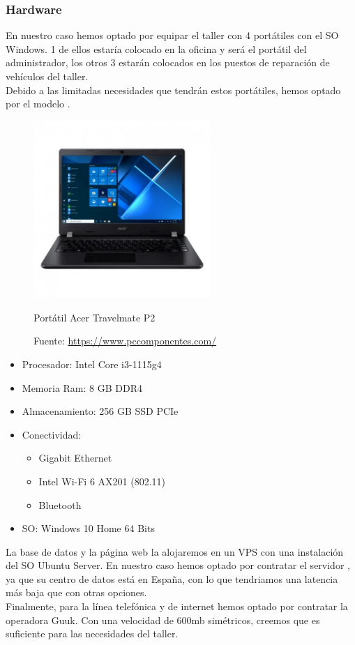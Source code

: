 \documentclass{article}
\begin{document}
\subsubsection{Hardware}
En nuestro caso hemos optado por equipar el taller con 4 portátiles con el SO Windows. 1 de ellos estaría colocado en la oficina y será el portátil del administrador, los otros 3 estarán colocados 
en los puestos de reparación de vehículos del taller.\\
Debido a las limitadas necesidades que tendrán estos portátiles, hemos optado por el modelo \href{https://www.pccomponentes.com/acer-travelmate-p2-tmp214-53-37at-intel-core-i3-1115g4-8gb-256gb-ssd-14}{}.\\
\begin{figure}[H]
  \centering
  \includegraphics[width=0.6\textwidth]{CapturasSistemas/portatil.png}
  \caption{Portátil Acer Travelmate P2}
  \caption*{Fuente: \href{https://www.pccomponentes.com/acer-travelmate-p2-tmp214-53-37at-intel-core-i3-1115g4-8gb-256gb-ssd-14}{https://www.pccomponentes.com/}}
\end{figure}
\begin{itemize}
  \item Procesador: Intel Core i3-1115g4
  \item Memoria Ram: 8 GB DDR4
  \item Almacenamiento: 256 GB SSD PCIe
  \item Conectividad: \begin{itemize}
    \item Gigabit Ethernet
    \item Intel Wi-Fi 6 AX201 (802.11)
    \item Bluetooth
  \end{itemize}
  \item SO: Windows 10 Home 64 Bits
\end{itemize}
La base de datos y la página web la alojaremos en un VPS con una instalación del SO Ubuntu Server. En nuestro caso hemos optado por contratar el servidor \href{https://www.arsys.es/servidores/vps}{\color{red}{Arsys VPS M}},
ya que su centro de datos está en España, con lo que tendriamos una latencia más baja que con otras opciones. \\
Finalmente, para la línea telefónica y de internet hemos optado por contratar la operadora Guuk. Con una velocidad de 600mb simétricos, creemos que es suficiente para las necesidades del taller. \\
\end{document}
